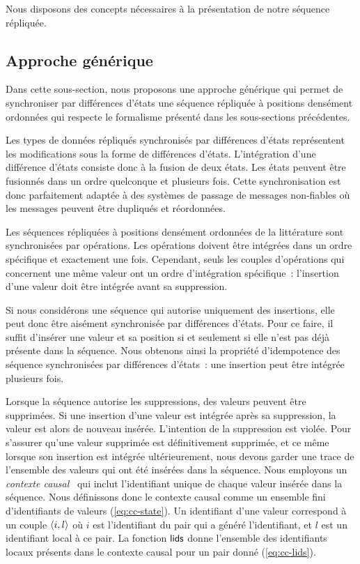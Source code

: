 Nous disposons des concepts nécessaires à la présentation de notre séquence répliquée.


\subsection{Approche générique}

Dans cette sous-section, nous proposons une approche générique qui permet de synchroniser par différences d'états une séquence répliquée à positions densément ordonnées qui respecte le formalisme présenté dans les sous-sections précédentes.

Les types de données répliqués synchronisés par différences d'états représentent les modifications sous la forme de différences d'états.
L'intégration d'une différence d'états consiste donc à la fusion de deux états.
Les états peuvent être fusionnés dans un ordre quelconque et plusieurs fois.
Cette synchronisation est donc parfaitement adaptée à des systèmes de passage de messages non-fiables où les messages peuvent être dupliqués et réordonnées.

Les séquences répliquées à positions densément ordonnées de la littérature sont synchronisées par opérations.
Les opérations doivent être intégrées dans un ordre spécifique et exactement une fois.
Cependant, seuls les couples d'opérations qui concernent une même valeur ont un ordre d'intégration spécifique~: l'insertion d'une valeur doit être intégrée avant sa suppression.

Si nous considérons une séquence qui autorise uniquement des insertions, elle peut donc être aisément synchronisée par différences d'états.
Pour ce faire, il suffit d'insérer une valeur et sa position si et seulement si elle n'est pas déjà présente dans la séquence.
Nous obtenons ainsi la propriété d'idempotence des séquence synchronisées par différences d'états~: une insertion peut être intégrée plusieurs fois.

Lorsque la séquence autorise les suppressions, des valeurs peuvent être supprimées.
Si une insertion d'une valeur est intégrée après sa suppression, la valeur est alors de nouveau insérée.
L'intention de la suppression est violée.
Pour s'assurer qu'une valeur supprimée est définitivement supprimée, et ce même lorsque son insertion est intégrée ultérieurement, nous devons garder une trace de l'ensemble des valeurs qui ont été insérées dans la séquence.
Nous employons un \emph{contexte causal}~\autocite{almeida_2018_delta-crdt-revisited} qui inclut l'identifiant unique de chaque valeur insérée dans la séquence.
Nous définissons donc le contexte causal comme un ensemble fini d'identifiants de valeurs (\autoref{eq:cc-state}).
Un identifiant d'une valeur correspond à un couple $\tuple*{i, l}$ où $i$ est l'identifiant du pair qui a généré l'identifiant, et $l$ est un identifiant local à ce pair.
La fonction $\trm{lids}$ donne l'ensemble des identifiants locaux présents dans le contexte causal pour un pair donné (\autoref{eq:cc-lids}).

